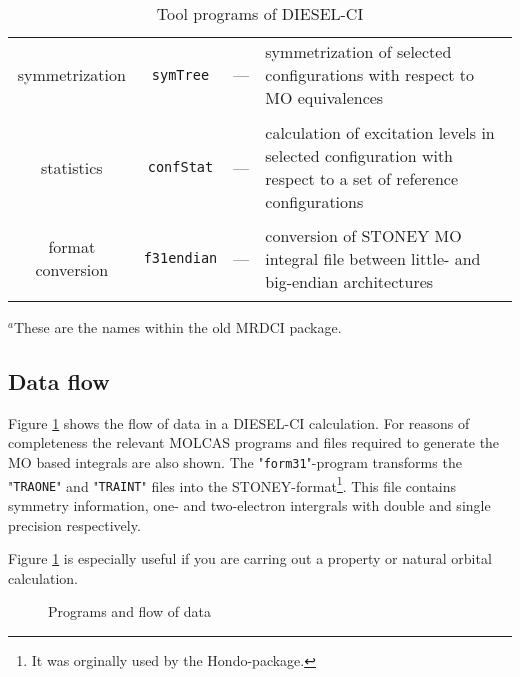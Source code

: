 \begin{table}[h]
\begin{center}
\begin{tabular}{c|c|c|p{6cm}}
\begin{minipage}[t]{2.5cm}
\begin{center}
symmetrization
\end{center}
\end{minipage}
& {\tt symTree} & --- &symmetrization of selected configurations
with respect to MO equivalences
\\[5pt]
\begin{minipage}[t]{2.5cm}
\begin{center}
exciatation\\
statistics
\end{center}
\end{minipage}
& {\tt confStat} & --- &calculation of excitation levels in selected
configuration with respect to a set of reference configurations
\\[5pt]
\begin{minipage}[t]{2.5cm}
\begin{center}
format conversion
\end{center}
\end{minipage}
& {\tt f31endian} & --- &conversion of STONEY MO integral file
between little- and big-endian architectures
\\[5pt]
\end{tabular}
\end{center}
$^a${\footnotesize These are the names within the old MRDCI package.}
\caption{\label{TabDIESELTeileHilf} Tool programs of DIESEL-CI}
\end{table}



\subsection{Data flow}

Figure \ref{FigDataFlow} shows the flow of data in a DIESEL-CI calculation.
For reasons of completeness the relevant MOLCAS programs and files 
required to generate the MO based integrals are
also shown. The "{\tt form31}"-program transforms the "{\tt TRAONE}"
and "{\tt TRAINT}" files into the STONEY-format\footnote{It was
orginally used by the Hondo-package.}. This file contains symmetry
information, one- and two-electron intergrals with double and single
precision respectively.

Figure \ref{FigDataFlow} is especially useful if you are carring out 
a property or natural orbital calculation.

\begin{figure}
\begin{center}

\caption{\label{FigDataFlow}
Programs and flow of data}
\end{center}
\end{figure}




